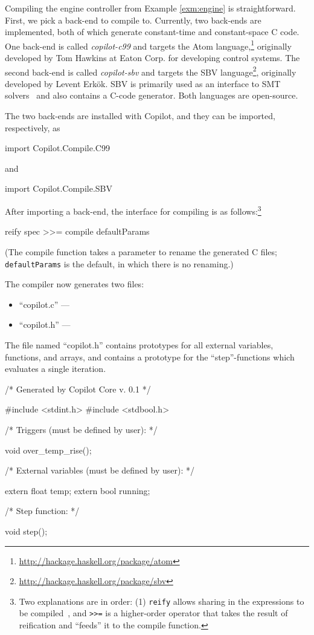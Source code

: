Compiling the engine controller from Example \ref{exm:engine} is
straightforward.  First, we pick a back-end to compile to.  Currently, two
back-ends are implemented, both of which generate constant-time and
constant-space C code.  One back-end is called \emph{copilot-c99} and targets
the Atom language,\footnote{\url{http://hackage.haskell.org/package/atom}}
originally developed by Tom Hawkins at Eaton Corp. for developing control
systems.  The second back-end is called \emph{copilot-sbv} and targets the SBV
language\footnote{\url{http://hackage.haskell.org/package/sbv}}, originally
developed by Levent Erk\"{o}k.  SBV is primarily used as an interface to SMT
solvers~\cite{smt} and also contains a C-code generator.  Both
languages are open-source.

The two back-ends are installed with Copilot, and they can be imported,
respectively, as

\begin{code}
import Copilot.Compile.C99
\end{code}
\noindent
and
\begin{code}
import Copilot.Compile.SBV
\end{code}

After importing a back-end, the interface for compiling is as
follows:\footnote{Two explanations are in order: (1) {\tt reify} allows sharing in the expressions to be compiled~\cite{DSLExtract}, and {\tt >>=} is a higher-order
  operator that takes the result of reification and ``feeds'' it to the compile
  function.}
%
\begin{code}
reify spec >>= compile defaultParams
\end{code}
%
\noindent
(The compile function takes a parameter to rename the generated C files; {\tt
  defaultParams} is the default, in which there is no renaming.)

The compiler now generates two files:

\begin{itemize}
\item ``copilot.c'' --- 
\item ``copilot.h'' --- 
\end{itemize}

The file named ``copilot.h'' contains prototypes for all external variables, functions, and arrays,
and contains a prototype for the ``step''-functions which evaluates a single iteration.

\begin{code}
/* Generated by Copilot Core v. 0.1 */

#include <stdint.h>
#include <stdbool.h>

/* Triggers (must be defined by user): */

void over_temp_rise();

/* External variables (must be defined by user): */

extern float temp;
extern bool running;

/* Step function: */

void step();
\end{code}

